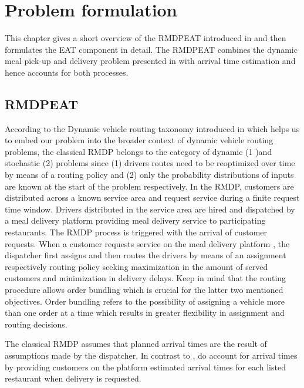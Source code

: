 \chapter{Problem formulation}

This chapter gives a short overview of the RMDPEAT introduced in \cite{Hildebrandt2020_EAT} and then formulates the EAT component in detail. The RMDPEAT combines the dynamic meal pick-up and delivery problem presented in \cite{UlmerRMDP} with arrival time estimation and hence accounts for both processes.  

\section{RMDPEAT} 

According to the Dynamic vehicle routing taxonomy introduced in \cite{psaraftis} which helps us to embed our problem into the broader context of dynamic vehicle routing problems, the classical RMDP belongs to the category of dynamic (1 )and stochastic (2) problems since (1) drivers routes need to be reoptimized over time by means of a routing policy and (2) only the probability distributions of inputs are known at the start of the problem respectively. In the RMDP, customers are distributed across a known service area and request service during a finite request time window. Drivers distributed in the service area are hired and dispatched by a meal delivery platform providing meal delivery service to participating restaurants. The RMDP process is triggered with the arrival of customer requests. When a customer requests service on the meal delivery platform , the dispatcher first assigns and then routes the drivers by means of an assignment respectively routing policy seeking maximization in the amount of served customers and minimization in delivery delays. Keep in mind that the routing procedure allows order bundling which is crucial for the latter two mentioned objectives. Order bundling refers to the possibility of assigning a vehicle more than one order at a time which results in greater flexibility in assignment and routing decisions.

The classical RMDP assumes that planned arrival times are the result of assumptions made by the dispatcher. In contrast to \citet{UlmerRMDP}, \citet{Hildebrandt2020_EAT} do account for arrival times by providing customers on the platform estimated arrival times for each listed restaurant when delivery is requested. 
  
